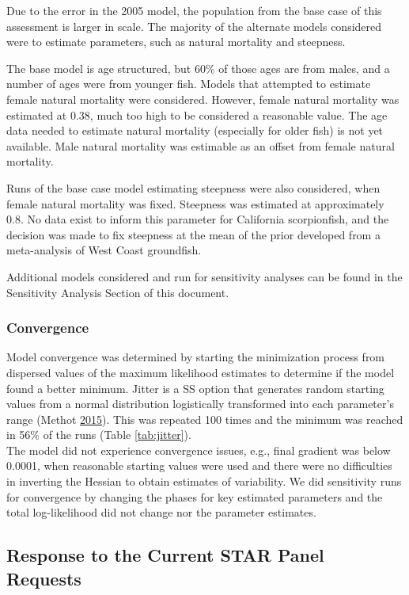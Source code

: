\documentclass[12pt,]{article}
\begin{document}
Due to the error in the 2005 model, the population from the base case of
this assessment is larger in scale. The majority of the alternate models
considered were to estimate parameters, such as natural mortality and
steepness.

The base model is age structured, but 60\% of those ages are from males,
and a number of ages were from younger fish. Models that attempted to
estimate female natural mortality were considered. However, female
natural mortality was estimated at 0.38, much too high to be considered
a reasonable value. The age data needed to estimate natural mortality
(especially for older fish) is not yet available. Male natural mortality
was estimable as an offset from female natural mortality.

Runs of the base case model estimating steepness were also considered,
when female natural mortality was fixed. Steepness was estimated at
approximately 0.8. No data exist to inform this parameter for California
scorpionfish, and the decision was made to fix steepness at the mean of
the prior developed from a meta-analysis of West Coast groundfish.

Additional models considered and run for sensitivity analyses can be
found in the Sensitivity Analysis Section of this document.

\subsubsection{Convergence}\label{convergence}

Model convergence was determined by starting the minimization process
from dispersed values of the maximum likelihood estimates to determine
if the model found a better minimum. Jitter is a SS option that
generates random starting values from a normal distribution logistically
transformed into each parameter's range (Methot
\protect\hyperlink{ref-Methot2015}{2015}). This was repeated 100 times
and the minimum was reached in 56\% of the runs (Table
\ref{tab:jitter}).\\
The model did not experience convergence issues, e.g., final gradient
was below 0.0001, when reasonable starting values were used and there
were no difficulties in inverting the Hessian to obtain estimates of
variability. We did sensitivity runs for convergence by changing the
phases for key estimated parameters and the total log-likelihood did not
change nor the parameter estimates.

\subsection{Response to the Current STAR Panel
Requests}\label{response-to-the-current-star-panel-requests}
\end{document}
